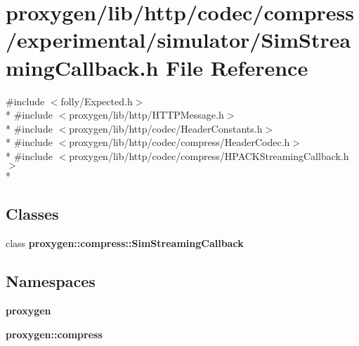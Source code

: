 \section{proxygen/lib/http/codec/compress/experimental/simulator/\+Sim\+Streaming\+Callback.h File Reference}
\label{SimStreamingCallback_8h}
{\ttfamily \#include $<$folly/\+Expected.\+h$>$}\\*
{\ttfamily \#include $<$proxygen/lib/http/\+H\+T\+T\+P\+Message.\+h$>$}\\*
{\ttfamily \#include $<$proxygen/lib/http/codec/\+Header\+Constants.\+h$>$}\\*
{\ttfamily \#include $<$proxygen/lib/http/codec/compress/\+Header\+Codec.\+h$>$}\\*
{\ttfamily \#include $<$proxygen/lib/http/codec/compress/\+H\+P\+A\+C\+K\+Streaming\+Callback.\+h$>$}\\*
\subsection*{Classes}
\begin{DoxyCompactItemize}
\item 
class {\bf proxygen\+::compress\+::\+Sim\+Streaming\+Callback}
\end{DoxyCompactItemize}
\subsection*{Namespaces}
\begin{DoxyCompactItemize}
\item 
 {\bf proxygen}
\item 
 {\bf proxygen\+::compress}
\end{DoxyCompactItemize}
